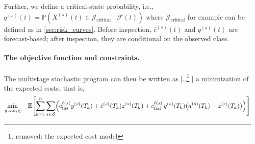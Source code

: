 \documentclass{article}
\providecommand{\DIFadd}[1]{{\protect\color{blue} \sf #1}} %
\providecommand{\DIFdel}[1]{{\protect\color{red} [..\footnote{removed: #1} ]}} %
\providecommand{\DIFaddbegin}{} %
\providecommand{\DIFaddend}{} %
\providecommand{\DIFdelbegin}{} %
\providecommand{\DIFdelend}{} %
\begin{document}
\DIFadd{Further, we define a critical-state probability, i.e., 
$
q^{(s)}(t) = \mathds P\left(X^{(s)}(t) \in \mathcal J_{\text{critical}} \mid \mathcal F(t) \right)
$ 
where $\mathcal J_{\text{critical}}$ for example can be defined as in \cref{sec:risk_curves}.
Before inspection, $\bar c^{(s)}(t)$ and $q^{(s)}(t)$ are forecast-based; after inspection, they are conditional on the observed class.
}

\paragraph{\DIFadd{The objective function and constraints.}}
\DIFadd{The multistage stochastic program }\DIFaddend can then be written as \DIFdelbegin \DIFdel{the expected cost model
}%
\DIFdelend \DIFaddbegin \DIFadd{a minimization of the expected costs, that is,
}\begin{align}
\min_{y,z,a,\chi}\quad
\mathbb E\!\left[
\sum_{k=1}^n\sum_{s\in\mathcal S}
\Bigl(
c_{\mathrm{ins}}^{\ell(s)} y^{(s)}(T_k)
+ \bar c^{(s)}(T_k) z^{(s)}(T_k)
+ c_{\mathrm{fail}}^{\ell(s)}\,q^{(s)}(T_k)\bigl(a^{(s)}(T_k)-z^{(s)}(T_k)\bigr)
\Bigr)
\right]
\label{eq:general_textbook_obj}
\end{align}\DIFaddend 
\end{document}
